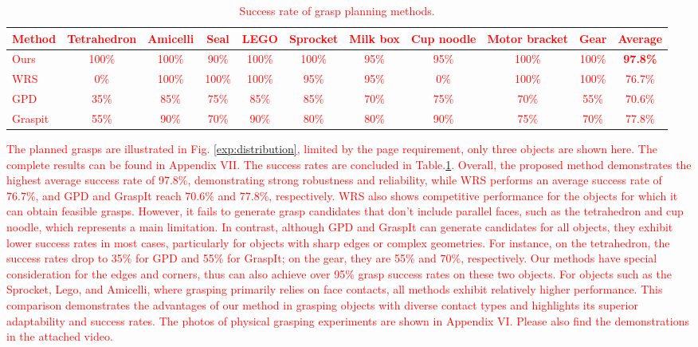\documentclass[journal]{IEEEtran}
\newcommand{\rev}[1]{\textcolor{red}{#1}}
\begin{document}
\begin{table}[t]
    \centering
    \small
    \setlength{\tabcolsep}{4pt}
    \caption{\rev{Success rate of grasp planning methods.}}
    \rev{
    \label{tab:statistical results}
    \begin{threeparttable}
    \begin{tabular}{l|ccccccccc|c}
        \toprule
        Method & Tetrahedron & Amicelli & Seal & LEGO & Sprocket & Milk box & Cup noodle & Motor bracket & Gear &  Average \\
        \midrule
        Ours & 100\% & 100\% & 90\% & 100\% & 100\% & 95\% & 95\% & 100\% & 100\% & \textbf{97.8\%} \\
        WRS~\cite{wan2020planning} & 0\%   & 100\% & 100\% & 100\% & 95\%  & 95\% & 0\%  & 100\% & 100\% & 76.7\% \\
        GPD~\cite{ten2017grasp}& 35\%  & 85\%  & 75\%  & 85\%  & 85\%  & 70\% & 75\% & 70\%  & 55\%  & 70.6\% \\
        Graspit~\cite{miller_graspit_2021} & 55\%  & 90\%  & 70\%  & 90\%  & 80\%  & 80\% & 90\% & 75\%  & 70\%  & 77.8\% \\
        \bottomrule
    \end{tabular}
    \end{threeparttable}
    }
\end{table}

\rev{The planned grasps are illustrated in Fig. \ref{exp:distribution}, limited by the page requirement, only three objects are shown here. The complete results can be found in Appendix VII. The success rates are concluded in Table.\ref{tab:statistical results}. Overall, the proposed method demonstrates the highest average success rate of 97.8\%, demonstrating strong robustness and reliability, while WRS performs an average success rate of 76.7\%, and GPD and GraspIt reach 70.6\% and 77.8\%, respectively. WRS also shows competitive performance for the objects for which it can obtain feasible grasps. However, it fails to generate grasp candidates that don't include parallel faces, such as the tetrahedron and cup noodle, which represents a main limitation. In contrast, although GPD and GraspIt can generate candidates for all objects, they exhibit lower success rates in most cases, particularly for objects with sharp edges or complex geometries. For instance, on the tetrahedron, the success rates drop to 35\% for GPD and 55\% for GraspIt; on the gear, they are 55\% and 70\%, respectively. Our methods have special consideration for the edges and corners, thus can also achieve over 95\% grasp success rates on these two objects. For objects such as the Sprocket, Lego, and Amicelli, where grasping primarily relies on face contacts, all methods exhibit relatively higher performance. This comparison demonstrates the advantages of our method in grasping objects with diverse contact types and highlights its superior adaptability and success rates. The photos of physical grasping experiments are shown in Appendix VI. Please also find the demonstrations in the attached video.}
\end{document}

